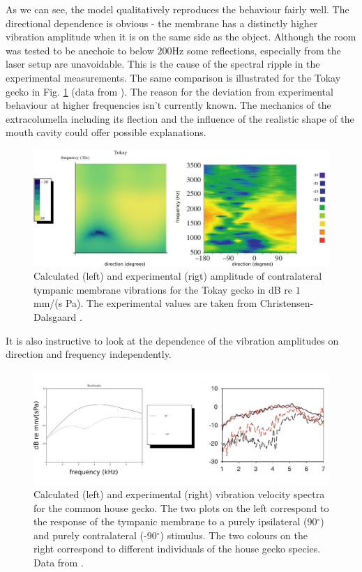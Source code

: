 As we can see, the model qualitatively reproduces the behaviour fairly well. The directional dependence is obvious - the membrane has a distinctly higher
vibration amplitude when it is on the same side as the object. Although the room was tested to be anechoic to below $200$Hz some reflections, especially from
the laser setup are unavoidable. This is the cause of the spectral ripple in the experimental measurements. The same comparison is illustrated for the Tokay gecko in Fig. \ref{tokayvibampfull} (data from \cite{dalsgaardmanley1}).
The reason for the deviation from experimental behaviour at higher frequencies isn't currently known. The mechanics of the extracolumella including its flection and the influence of the realistic shape
of the mouth cavity could offer possible explanations.
\begin{figure}[ht]
 \centering
 \includegraphics[width=1.0\linewidth]{Diagrams/Plots/tokayvibampfull.png}
 \caption[Vibration amplitude for the Tokay gecko]{Calculated (left) and experimental (rigt) amplitude of contralateral tympanic membrane vibrations for the Tokay gecko
 in dB re $1$ mm/(s Pa). The experimental values are taken from Christensen-Dalsgaard \cite{dalsgaardmanley1}.}
  \label{tokayvibampfull}
\end{figure}

It is also instructive to look at the dependence of the vibration amplitudes on direction and frequency independently.
\begin{figure}[ht]
 \centering
 \includegraphics[width=1.0\linewidth]{Diagrams/Plots/hemidactylusipsivscontrafull.png}
 \caption[Frequency dependence of ipsi- and contralateral membrane vibration amplitudes]{Calculated (left) and experimental (right) vibration velocity spectra for the common house gecko. The two plots
 on the left correspond to the response of the tympanic membrane to a purely ipsilateral (90$^\circ$) and purely contralateral (-90$^\circ$) stimulus.  The two colours on the right correspond to
 different individuals of the house gecko species. Data from \cite{dalsgaardmanley2}.}
  \label{hemidactylusipsivscontrafull}
\end{figure}
